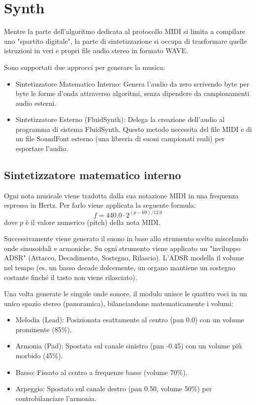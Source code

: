\section{Synth}
Mentre la parte dell'algoritmo dedicata al protocollo MIDI si limita a compilare uno "spartito digitale", la parte di sintetizzazione si occupa di trasformare quelle istruzioni in veri e propri file audio stereo in formato WAVE.


Sono supportati due approcci per generare la musica:
\begin{itemize}
    \item Sintetizzatore Matematico Interno: Genera l'audio da zero scrivendo byte per byte le forme d'onda attraverso algoritmi, senza dipendere da campionamenti audio esterni.
    \item Sintetizzatore Esterno (FluidSynth): Delega la creazione dell'audio al programma di sistema FluidSynth. Questo metodo necessita del file MIDI e di un file SoundFont esterno (una libreria di suoni campionati reali) per esportare l'audio.
\end{itemize}

\subsection{Sintetizzatore matematico interno}
Ogni nota musicale viene tradotta dalla sua notazione MIDI in una frequenza espressa in Hertz.
Per farlo viene applicata la seguente formula:
\[f = 440.0 \cdot 2^{(p-69)/12.0}\]
dove $p$ è il valore numerico (pitch) della nota MIDI.

Successivamente viene generato il suono in base allo strumento scelto miscelando onde sinusoidali e armoniche. Su ogni strumento viene applicato un "inviluppo ADSR" (Attacco, Decadimento, Sostegno, Rilascio). 
L'ADSR modella il volume nel tempo (es. un basso decade dolcemente, un organo mantiene un sostegno costante finché il tasto non viene rilasciato).

Una volta generate le singole onde sonore, il modulo unisce le quattro voci in un unico spazio stereo (panoramica), bilanciandone matematicamente i volumi:
\begin{itemize}
    \item Melodia (Lead): Posizionata esattamente al centro (pan 0.0)
 con un volume prominente (85\%).
    \item  Armonia (Pad): Spostata sul canale sinistro (pan -0.45) con un volume più morbido (45\%).
    \item Basso: Fissato al centro a frequenze basse (volume 70\%).
    \item  Arpeggio: Spostato sul canale destro (pan 0.50, volume 50\%) per controbilanciare l'armonia.
\end{itemize}


